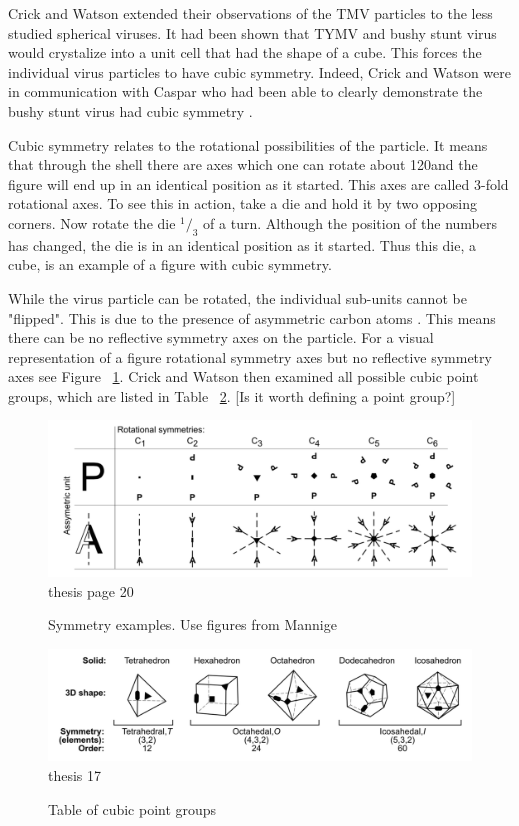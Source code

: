 \documentclass[12pt,letter]{article}
\newcommand*\rfrac[2]{{}^{#1}\!/_{#2}}
\begin{document}
Crick and Watson extended their observations of the TMV particles to the less studied spherical viruses. It had been shown that TYMV and bushy stunt virus would crystalize into a unit cell that had the shape of a cube. This forces the individual virus particles to have cubic symmetry. Indeed, Crick and Watson were in communication with Caspar who had been able to clearly demonstrate the bushy stunt virus had cubic symmetry \cite[p 474]{Crick:1956}. 

Cubic symmetry relates to the rotational possibilities of the particle. It means that through the shell there are axes which one can rotate about 120\degree and the figure will end up in an identical position as it started. This axes are called 3-fold rotational axes. To see this in action, take a die and hold it by two opposing corners. Now rotate the die $\rfrac{1}{3}$ of a turn. Although the position of the numbers has changed, the die is in an identical position as it started. Thus this die, a cube, is an example of a figure with cubic symmetry.

While the virus particle can be rotated, the individual sub-units cannot be "flipped". This is due to the presence of asymmetric carbon atoms \cite[p 474]{Crick:1956}. This means there can be no reflective symmetry axes on the particle. For a visual representation of a figure rotational symmetry axes but no reflective symmetry axes see Figure ~\ref{fig:reflect}. Crick and Watson then examined all possible cubic point groups, which are listed in Table ~\ref{table:cubic_groups}. [Is it worth defining a point group?]

\begin{figure}[h]
	\caption{Symmetry examples. Use figures from Mannige}
	\centering
	\includegraphics[width = .95\textwidth]{symmetry_examples.pdf}
	\label{fig:reflect}
	thesis page 20
\end{figure}

\begin{figure}[h]
	\caption{Table of cubic point groups}
	\centering
	\includegraphics[width = .95\textwidth]{point_groups.pdf}
	\label{table:cubic_groups}
	thesis 17
\end{figure}
\end{document}
